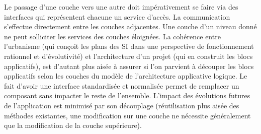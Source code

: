 \documentclass[12pt,a4paper]{article}
\begin{document}
\medbreak
Le passage d’une couche vers une autre doit impérativement se faire via des interfaces qui représentent chacune un service d’accès. La communication s’effectue directement entre les couches adjacentes. Une couche d’un niveau donné ne peut solliciter les services des couches éloignées.
La cohérence entre l’urbanisme (qui conçoit les plans des \gls{SI} dans une perspective de fonctionnement rationnel et d’évolutivité) et l’architecture d’un projet (qui en construit les blocs applicatifs), est d’autant plus aisée à assurer si l’on parvient à découper les blocs applicatifs selon les couches du modèle de l’architecture applicative logique.
\smallbreak
Le fait d’avoir une interface standardisée et normalisée permet de remplacer un composant sans impacter le reste de l’ensemble. L’impact des évolutions futures de l’application est minimisé par son découplage  (réutilisation plus aisée des méthodes existantes, une modification sur une couche ne nécessite généralement que la modification de la couche supérieure).
\end{document}

